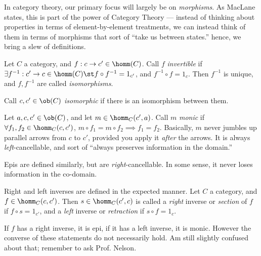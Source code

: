\documentclass{fkbook}
\theoremstyle{snazzydefinition}
\begin{document}
In category theory, our primary focus will largely be on
\emph{morphisms}. As MacLane states, this is part of the power of
Category Theory --- instead of thinking about properties in terms of
element-by-element treatments, we can instead think of them in terms
of morphisms that sort of ``take us between states.'' hence, we bring
a slew of definitions.\\

\begin{definition}
  Let $C$ a category, and $f : c \to c' \in \homm(C)$. Call $f$
  \emph{invertible} if $\exists f^{-1} : c' \to c \in \homm(C) \st
  f\circ f^{-1} = 1_{c'}$, and $f^{-1} \circ f = 1_c$. Then $f^{-1}$
  is unique, and $f, f^{-1}$ are called \emph{isomorphisms}.\\
\end{definition}
\begin{definition}[Isomorphism]
  Call $c, c' \in \ob(C)$ \emph{isomorphic} if there is an isomorphism
  between them.\\
\end{definition}
\begin{definition}[Monic]
  Let $a,c,c' \in \ob(C)$, and let $m \in \homm_C(c', a)$. Call $m$
  \emph{monic} if $\forall f_1, f_2 \in \homm_C(c,c')$, $m \circ f_1 =
  m \circ f_2 \implies f_1 = f_2$. Basically, $m$ never jumbles up
  parallel arrows from $c$ to $c'$, provided you apply it \emph{after}
  the arrows. It is always \emph{left}-cancellable, and sort of
  ``always preserves information in the domain.''\\
\end{definition}
\begin{definition}[Epi]
  Epis are defined similarly, but are \emph{right}-cancellable. In
  some sense, it never loses information in the co-domain.\\
\end{definition}
\begin{definition}
  Right and left inverses are defined in the expected manner. Let $C$
  a category, and $f \in \homm_C(c,c')$. Then $s \in \homm_C(c', c)$
  is called a \emph{right} inverse or \emph{section} of $f$ if $f\circ
  s = 1_{c'}$, and a \emph{left} inverse or \emph{retraction} if
  $s\circ f = 1_c$. \\
\end{definition}
If $f$ has a right inverse, it is epi, if it has a left inverse, it is
monic. However the converse of these statements do not necessarily
hold. Am still slightly confused about that; remember to ask Prof.
Nelson.
\end{document}

